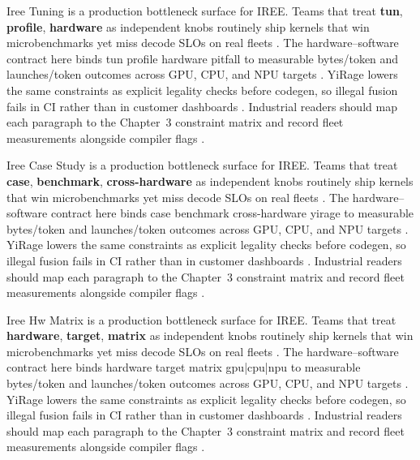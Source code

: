 Iree Tuning is a production bottleneck surface for IREE. Teams that treat \textbf{tun}, \textbf{profile}, \textbf{hardware} as independent knobs routinely ship kernels that win microbenchmarks yet miss decode SLOs on real fleets \citep{dlbook,nvidia2024cudagraphs}. The hardware--software contract here binds tun profile hardware pitfall to measurable bytes/token and launches/token outcomes across GPU, CPU, and NPU targets \citep{dao2022flashattention,liu2024deepseekv3}. YiRage lowers the same constraints as explicit legality checks before codegen, so illegal fusion fails in CI rather than in customer dashboards \citep{kwon2023vllm,patel2025llminference}. Industrial readers should map each paragraph to the Chapter~3 constraint matrix and record fleet measurements alongside compiler flags \citep{nvidia2024cudagraphs,taxbreak2026}.

Iree Case Study is a production bottleneck surface for IREE. Teams that treat \textbf{case}, \textbf{benchmark}, \textbf{cross-hardware} as independent knobs routinely ship kernels that win microbenchmarks yet miss decode SLOs on real fleets \citep{dao2022flashattention,liu2024deepseekv3}. The hardware--software contract here binds case benchmark cross-hardware yirage to measurable bytes/token and launches/token outcomes across GPU, CPU, and NPU targets \citep{kwon2023vllm,patel2025llminference}. YiRage lowers the same constraints as explicit legality checks before codegen, so illegal fusion fails in CI rather than in customer dashboards \citep{nvidia2024cudagraphs,taxbreak2026}. Industrial readers should map each paragraph to the Chapter~3 constraint matrix and record fleet measurements alongside compiler flags \citep{liu2024deepseekv3,memoryfloor2026}.

Iree Hw Matrix is a production bottleneck surface for IREE. Teams that treat \textbf{hardware}, \textbf{target}, \textbf{matrix} as independent knobs routinely ship kernels that win microbenchmarks yet miss decode SLOs on real fleets \citep{kwon2023vllm,patel2025llminference}. The hardware--software contract here binds hardware target matrix gpu|cpu|npu to measurable bytes/token and launches/token outcomes across GPU, CPU, and NPU targets \citep{nvidia2024cudagraphs,taxbreak2026}. YiRage lowers the same constraints as explicit legality checks before codegen, so illegal fusion fails in CI rather than in customer dashboards \citep{liu2024deepseekv3,memoryfloor2026}. Industrial readers should map each paragraph to the Chapter~3 constraint matrix and record fleet measurements alongside compiler flags \citep{patel2025llminference,nvidia2022hopper}.

